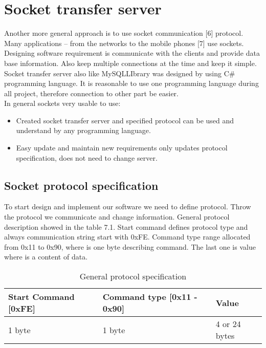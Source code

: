%
\section{Socket transfer server}

Another more general approach is to use socket communication [6] protocol. Many applications – from the networks to the mobile phones [7] use sockets. Designing software requirement is communicate with the clients and provide data base information. Also keep multiple connections at the time and keep it simple.  Socket transfer server also like MySQLLIbrary was designed by using C\# programming language. It is reasonable to use one programming language during all project, therefore connection to other part be easier. \\ In general sockets very usable to use: 

\begin{itemize}
	\item Created socket transfer server and specified protocol can be used and understand by any programming language.
	\item Easy update and maintain new requirements only updates protocol specification, does not need to change server.
\end{itemize}

\subsection{Socket protocol specification}

To start design and implement our software we need to define protocol. Throw the protocol we communicate and change information. General protocol description showed in the table 7.1. Start command defines protocol type and always communication string start with 0xFE. Command type range allocated from 0x11 to 0x90, where is one byte describing command. The last one is value where is a content of data.

\begin{table}[h]
	\centering
    \begin{tabular}{ | p{4cm} | p{5cm} | p{4cm} | }
    \hline
    \textbf{Start Command} [0xFE] & \textbf{Command type} [0x11 - 0x90] & \textbf{Value}  \\ \hline
    1 byte & 1 byte & 4 or 24 bytes  \\ \hline
    \end{tabular}
	\caption{General protocol specification}
	\label{tab:AdDis}
\end{table}

